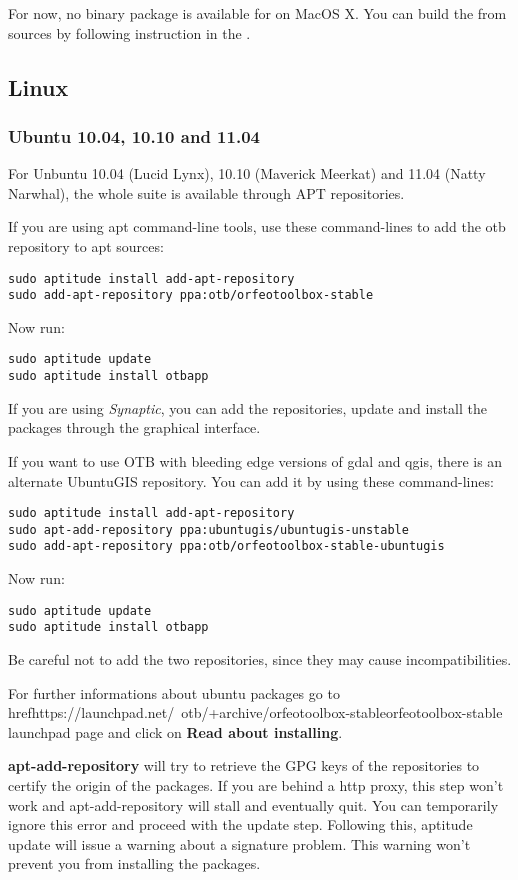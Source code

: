 For now, no binary package is available for \app on MacOS X. You can
build the \app from sources by following instruction in the \sg.

\subsection{Linux}

\subsubsection{Ubuntu 10.04, 10.10 and 11.04}
\label{ssec:ubuntu_binaries}
For Unbuntu 10.04 (Lucid Lynx), 10.10 (Maverick Meerkat) and 11.04
(Natty Narwhal), the whole \otb suite is available through APT repositories.

If you are using apt command-line tools, use these command-lines to
add the otb repository to apt sources:
\begin{verbatim}
sudo aptitude install add-apt-repository 
sudo add-apt-repository ppa:otb/orfeotoolbox-stable
\end{verbatim}
Now run:
\begin{verbatim}
sudo aptitude update
sudo aptitude install otbapp
\end{verbatim}

If you are using \emph{Synaptic}, you can add the repositories, update
and install the packages through the graphical interface.

If you want to use OTB with bleeding edge versions of gdal and qgis,
there is an alternate UbuntuGIS repository.  You can add it by using
these command-lines:
\begin{verbatim}
sudo aptitude install add-apt-repository 
sudo apt-add-repository ppa:ubuntugis/ubuntugis-unstable
sudo add-apt-repository ppa:otb/orfeotoolbox-stable-ubuntugis
\end{verbatim}
Now run:
\begin{verbatim}
sudo aptitude update
sudo aptitude install otbapp
\end{verbatim}

Be careful not to add the two repositories, since they may cause
incompatibilities.

For further informations about ubuntu packages go to
href{https://launchpad.net/~otb/+archive/orfeotoolbox-stable}{orfeotoolbox-stable
  launchpad page} and click on \textbf{Read about installing}.

\textbf{apt-add-repository} will try to retrieve the GPG keys of the
repositories to certify the origin of the packages. If you are behind
a http proxy, this step won't work and apt-add-repository will stall
and eventually quit. You can temporarily ignore this error and proceed
with the update step. Following this, aptitude update will issue a
warning about a signature problem. This warning won't prevent you from
installing the packages.

